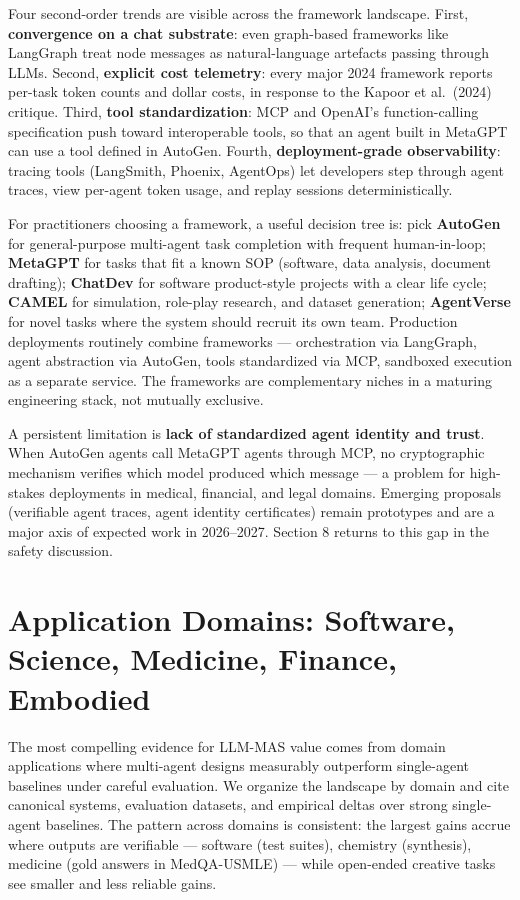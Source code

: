 Four second-order trends are visible across the framework landscape. First, \textbf{convergence on a chat substrate}: even graph-based frameworks like LangGraph treat node messages as natural-language artefacts passing through LLMs. Second, \textbf{explicit cost telemetry}: every major 2024 framework reports per-task token counts and dollar costs, in response to the Kapoor et al.~(2024) critique. Third, \textbf{tool standardization}: MCP and OpenAI's function-calling specification push toward interoperable tools, so that an agent built in MetaGPT can use a tool defined in AutoGen. Fourth, \textbf{deployment-grade observability}: tracing tools (LangSmith, Phoenix, AgentOps) let developers step through agent traces, view per-agent token usage, and replay sessions deterministically.

For practitioners choosing a framework, a useful decision tree is: pick \textbf{AutoGen} for general-purpose multi-agent task completion with frequent human-in-loop; \textbf{MetaGPT} for tasks that fit a known SOP (software, data analysis, document drafting); \textbf{ChatDev} for software product-style projects with a clear life cycle; \textbf{CAMEL} for simulation, role-play research, and dataset generation; \textbf{AgentVerse} for novel tasks where the system should recruit its own team. Production deployments routinely combine frameworks --- orchestration via LangGraph, agent abstraction via AutoGen, tools standardized via MCP, sandboxed execution as a separate service. The frameworks are complementary niches in a maturing engineering stack, not mutually exclusive.

A persistent limitation is \textbf{lack of standardized agent identity and trust}. When AutoGen agents call MetaGPT agents through MCP, no cryptographic mechanism verifies which model produced which message --- a problem for high-stakes deployments in medical, financial, and legal domains. Emerging proposals (verifiable agent traces, agent identity certificates) remain prototypes and are a major axis of expected work in 2026--2027. Section 8 returns to this gap in the safety discussion.

\section{Application Domains: Software, Science, Medicine, Finance, Embodied}\label{application-domains-software-science-medicine-finance-embodied}

The most compelling evidence for LLM-MAS value comes from domain applications where multi-agent designs measurably outperform single-agent baselines under careful evaluation. We organize the landscape by domain and cite canonical systems, evaluation datasets, and empirical deltas over strong single-agent baselines. The pattern across domains is consistent: the largest gains accrue where outputs are verifiable --- software (test suites), chemistry (synthesis), medicine (gold answers in MedQA-USMLE) --- while open-ended creative tasks see smaller and less reliable gains.

